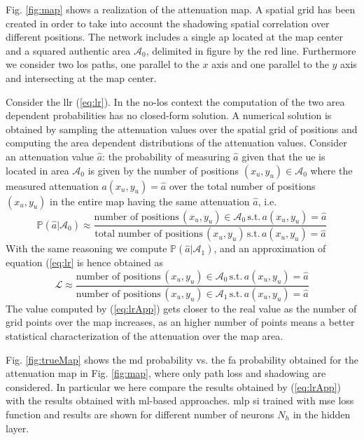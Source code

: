\documentclass[draftcls,onecolumn,12pt]{IEEEtran}
\begin{document}
Fig. \ref{fig:map} shows a realization of the attenuation map. A spatial grid has been created in order to take into account the shadowing spatial correlation over different positions. The network includes a single \ac{ap} located at the map center and a squared authentic area $\mathcal{A}_0$, delimited in figure by the red line. Furthermore we consider two \ac{los} paths, one parallel to the $x$ axis and one parallel to the $y$ axis and intersecting at the map center.

Consider the \ac{llr} (\ref{eq:lr}). In the no-\ac{los} context the computation of the two area dependent probabilities has no closed-form solution. A numerical solution is obtained by sampling the attenuation values over the spatial grid of positions and computing the area dependent distributions of the attenuation values. Consider an attenuation value $\hat{a}$: the probability of measuring $\hat{a}$ given that the \ac{ue} is located in area $\mathcal{A}_0$ is given by the number of positions $(x_u,y_u) \in \mathcal{A}_0$ where the measured attenuation $a(x_u,y_u)=\hat{a}$ over the total number of positions $(x_u,y_u)$ in the entire map having the same attenuation $\hat{a}$, i.e.
\begin{equation}
    \mathbb{P}(\hat{a}|\mathcal{A}_0) \approx \frac{\text{number of positions} \, (x_u,y_u) \in \mathcal{A}_0 \, \text{s.t.} \, a(x_u,y_u) = \hat{a}}{\text{total number of positions} \, (x_u,y_u) \, \text{s.t.} \, a(x_u,y_u) = \hat{a}}
\end{equation}
With the same reasoning we compute $\mathbb{P}(\hat{a}|\mathcal{A}_1)$, and an approximation of equation (\ref{eq:lr} is hence obtained as
\begin{equation}\label{eq:lrApp}
    \mathcal{L} \approx \frac{\text{number of positions} \, (x_u,y_u) \in \mathcal{A}_0 \, \text{s.t.} \, a(x_u,y_u) = \hat{a}}{\text{number of positions} \, (x_u,y_u) \in \mathcal{A}_1 \, \text{s.t.} \, a(x_u,y_u) = \hat{a}}
\end{equation}
The value computed by (\ref{eq:lrApp}) gets closer to the real value as the number of grid points over the map increases, as an higher number of points means a better statistical characterization of the attenuation over the map area.

Fig. \ref{fig:trueMap} shows the \ac{md} probability vs. the \ac{fa} probability obtained for the attenuation map in Fig. \ref{fig:map}, where only path loss and shadowing are considered. In particular we here compare the results obtained by (\ref{eq:lrApp}) with the results obtained with \ac{ml}-based approaches. \Ac{mlp} si trained with \ac{mse} loss function and results are shown for different number of neurons $N_h$ in the hidden layer.
\end{document}
